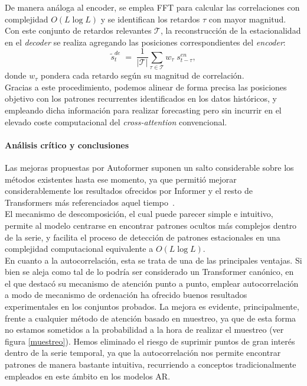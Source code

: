 De manera análoga al encoder, se emplea FFT para calcular las correlaciones con complejidad $O(L \log L)$ y se identifican los retardos $\tau$ con mayor magnitud. Con este conjunto de retardos relevantes $\mathcal{T}$, la reconstrucción de la estacionalidad en el \textit{decoder} se realiza agregando las posiciones correspondientes del \textit{encoder}:
\begin{equation}
    \tilde{s}^{de}_t \;=\; \frac{1}{|\mathcal{T}|} \sum_{\tau \in \mathcal{T}} w_\tau \; s^{en}_{t-\tau},
\end{equation}
donde $w_\tau$ pondera cada retardo según su magnitud de correlación.\\

Gracias a este procedimiento, podemos alinear de forma precisa las posiciones objetivo con los patrones recurrentes identificados en los datos históricos, y empleando dicha información para realizar forecasting pero sin incurrir en el elevado coste computacional del \textit{cross-attention} convencional.

\paragraph{Análisis crítico y conclusiones}

Las mejoras propuestas por Autoformer suponen un salto considerable sobre los métodos existentes hasta ese momento, ya que permitió mejorar considerablemente los resultados ofrecidos por Informer y el resto de Transformers más referenciados aquel tiempo~\cite{wu2022autoformerdecompositiontransformersautocorrelation}.\\

El mecanismo de descomposición, el cual puede parecer simple e intuitivo, permite al modelo centrarse en encontrar patrones ocultos más complejos dentro de la serie, y facilita el proceso de detección de patrones estacionales en una complejidad computacional equivalente a \(O(L \log L)\).\\

En cuanto a la autocorrelación, esta se trata de una de las principales ventajas. Si bien se aleja como tal de lo podría ser considerado un Transformer canónico, en el que destacó su mecanismo de atención punto a punto, emplear autocorrelación a modo de mecanismo de ordenación ha ofrecido buenos resultados experimentales en los conjuntos probados. La mejora es evidente, principalmente, frente a cualquier método de atención basado en muestreo, ya que de esta forma no estamos sometidos a la probabilidad a la hora de realizar el muestreo (ver figura \ref{muestreo}). Hemos eliminado el riesgo de suprimir puntos de gran interés dentro de la serie temporal, ya que la autocorrelación nos permite encontrar patrones de manera bastante intuitiva, recurriendo a conceptos tradicionalmente empleados en este ámbito en los modelos AR.

